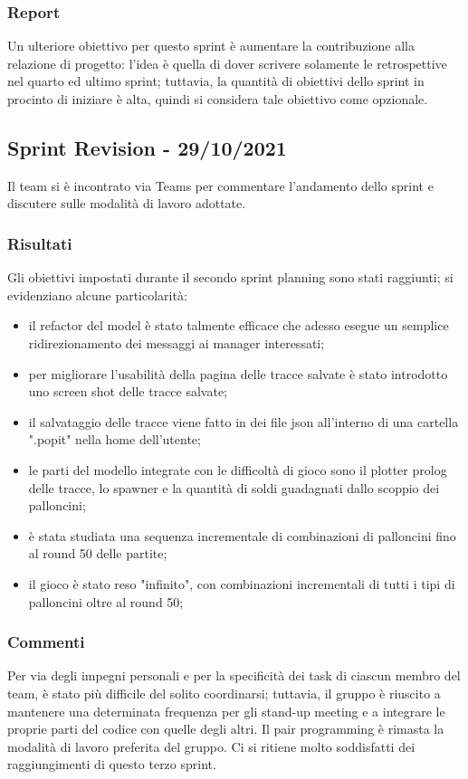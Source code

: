 \subsubsection{Report}
Un ulteriore obiettivo per questo sprint è aumentare la contribuzione alla relazione di progetto: l'idea è quella di
dover scrivere solamente le retrospettive nel quarto ed ultimo sprint; tuttavia, la quantità di obiettivi dello sprint
in procinto di iniziare è alta, quindi si considera tale obiettivo come opzionale.

\subsection{Sprint Revision - 29/10/2021}
Il team si è incontrato via Teams per commentare l'andamento dello sprint e discutere sulle modalità di lavoro adottate.

\subsubsection{Risultati}
Gli obiettivi impostati durante il secondo sprint planning sono stati raggiunti; si evidenziano alcune particolarità:
\begin{itemize}
    \item il refactor del model è stato talmente efficace che adesso esegue un semplice ridirezionamento dei messaggi ai manager interessati;
    \item per migliorare l'usabilità della pagina delle tracce salvate è stato introdotto uno screen shot delle tracce salvate;
    \item il salvataggio delle tracce viene fatto in dei file json all'interno di una cartella ".popit" nella home dell'utente;
    \item le parti del modello integrate con le difficoltà di gioco sono il plotter prolog delle tracce, lo spawner e la quantità di soldi guadagnati dallo scoppio dei palloncini;
    \item è stata studiata una sequenza incrementale di combinazioni di palloncini fino al round 50 delle partite;
    \item il gioco è stato reso "infinito", con combinazioni incrementali di tutti i tipi di palloncini oltre al round 50;
\end{itemize}

\subsubsection{Commenti}
Per via degli impegni personali e per la specificità dei task di ciascun membro del team, è stato più difficile del
solito coordinarsi; tuttavia, il gruppo è riuscito a mantenere una determinata frequenza per gli stand-up meeting e a
integrare le proprie parti del codice con quelle degli altri. Il pair programming è rimasta la modalità di lavoro
preferita del gruppo. Ci si ritiene molto soddisfatti dei raggiungimenti di questo terzo sprint.

\newpage